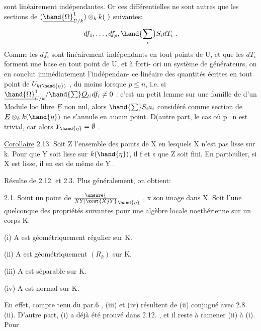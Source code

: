 
sont linéairement indépendantes. Or ces différentielles ne sont autres
que les sections de $(\underline{\hand{\Omega}}^1_{U/k})\otimes_k k(\ )$ suivantes:
\[ df_1, \ldots, df_p , \hand{\sum_i} S_i dT_i \ . \]
Comme les $df_i$ sont linéairement indépendants en tout points de U, et
que les $dT_i$ forment une base  en tout point de U,  et à forti-%
ori un système de générateurs, on en conclut immédiatement l'indépendan-%
ce linéaire des quantités écrites en tout point de $U_{k(\hand{\eta})}$ , du moins
lorsque $p\leq n$, i.e. si  $\underline{\hand{\Omega}}^1_{U/k} / \hand{\sum} \underline{O}_U df_i \neq 0$ : c'est un petit
lemme sur une famille de   d'un Module loc libre $\underline{E}$ non
nul, alors $\hand{\sum} S_i a_i$ considéré comme section de $\underline{E}\otimes_k k(\hand{\eta})$ ne s'annule
en aucun point. D(autre part, le cas où p=n est trivial, car alors
$Y_{\hand{\eta}} = \emptyset$ .

\uline{Corollaire} 2.13. Soit Z l'ensemble des points de X en lesquels X
n'est pas lisse sur k. Pour que Y soit lisse sur $k(\hand{\eta})$, il f et s
que Z soit fini. En particulier, si X est lisse, il en est de même de
Y .

Résulte de 2.12. et 2.3. Plus généralement, on obtient:

\uline{} 2.1. Soint  un point de $\unsure{\over{X}{Y}|\xout{X}Y}_{\hand{\eta}}$ , x son image dans X. Soit
  l'une quelconque des propriétés suivantes pour une algèbre
locale noethérienne sur un corps K:

(i) A est géométriquement régulier sur K.

(ii) A est géométriquement $(R_k)$ sur K.

(iii) A est séparable sur K.

(iv) A est  normal sur K.

 En effet, compte tenu du par.6 , (iii) et (iv)
résultent de (ii) conjugué avec 2.8. (ii). D'autre part, (i)
a déjà été prouvé dans 2.12. , et il reste à ramener (ii) à (i). Pour

